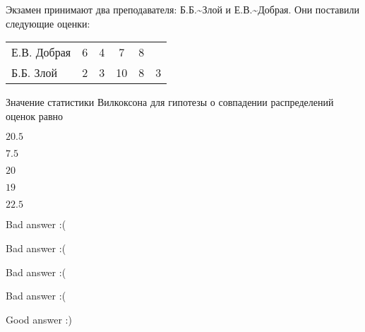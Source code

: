 
\begin{question}
Экзамен принимают два преподавателя: Б.Б.\textasciitilde{}Злой и
Е.В.\textasciitilde{}Добрая. Они поставили следующие оценки:

\vspace{5mm}
\begin{tabular}{lccccc}
\toprule
Е.В. Добрая & 6 & 4 & 7  & 8 &   \\
Б.Б. Злой   & 2 & 3 & 10 & 8 & 3 \\
\bottomrule
\end{tabular}
\vspace{5mm}

Значение статистики Вилкоксона для гипотезы о совпадении распределений
оценок равно
\begin{answerlist}
  \item \(20.5\)
  \item \(7.5\)
  \item \(20\)
  \item \(19\)
  \item \(22.5\)
\end{answerlist}
\end{question}

\begin{solution}
\begin{answerlist}
  \item Bad answer :(
  \item Bad answer :(
  \item Bad answer :(
  \item Bad answer :(
  \item Good answer :)
\end{answerlist}
\end{solution}

